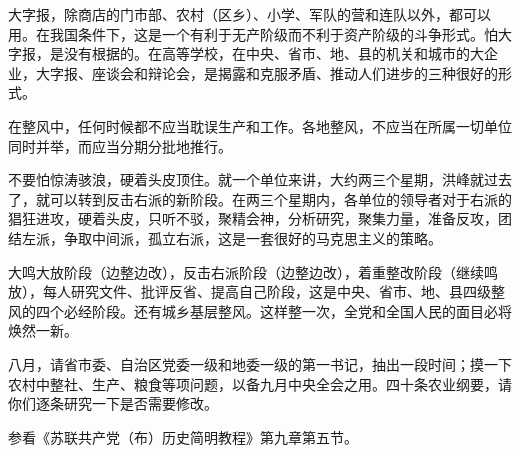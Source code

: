 大字报，除商店的门市部、农村（区乡）、小学、军队的营和连队以外，都可以用。在我国条件下，这是一个有利于无产阶级而不利于资产阶级的斗争形式。怕大字报，是没有根据的。在高等学校，在中央、省市、地、县的机关和城市的大企业，大字报、座谈会和辩论会，是揭露和克服矛盾、推动人们进步的三种很好的形式。

在整风中，任何时候都不应当耽误生产和工作。各地整风，不应当在所属一切单位同时并举，而应当分期分批地推行。

不要怕惊涛骇浪，硬着头皮顶住。就一个单位来讲，大约两三个星期，洪峰就过去了，就可以转到反击右派的新阶段。在两三个星期内，各单位的领导者对于右派的猖狂进攻，硬着头皮，只听不驳，聚精会神，分析研究，聚集力量，准备反攻，团结左派，争取中间派，孤立右派，这是一套很好的马克思主义的策略。

大鸣大放阶段（边整边改），反击右派阶段（边整边改），着重整改阶段（继续鸣放），每人研究文件、批评反省、提高自己阶段，这是中央、省市、地、县四级整风的四个必经阶段。还有城乡基层整风。这样整一次，全党和全国人民的面目必将焕然一新。

八月，请省市委、自治区党委一级和地委一级的第一书记，抽出一段时间；摸一下农村中整社、生产、粮食等项问题，以备九月中央全会之用。四十条农业纲要，请你们逐条研究一下是否需要修改。


\begin{maonote}
参看《苏联共产党（布）历史简明教程》第九章第五节。
\end{maonote}
